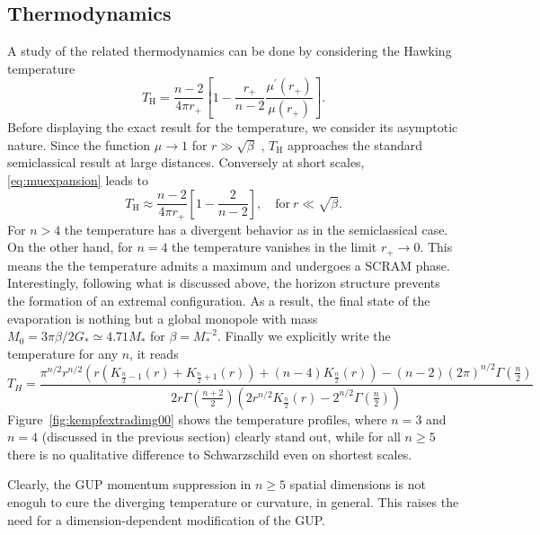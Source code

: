 \subsection{Thermodynamics}
A study of the related thermodynamics can be done by considering
the Hawking temperature 
\begin{equation}\label{eq:temp-higher-dim-def}
T_\mathrm{H}=\frac{n-2}{4\pi r_+}\left[1-\frac{r_+}{n-2}\frac{\mu^\prime(r_+)}{\mu(r_+)}\right].
\end{equation}
Before displaying the exact result for the temperature, we consider its asymptotic nature. Since the function $\mu\to 1$ for $r\gg \sqrt{\beta}$ , $T_\mathrm{H}$ approaches the standard semiclassical result at large distances. Conversely at short scales, \eqref{eq:muexpansion} leads to 
\begin{equation}
T_\mathrm{H}\approx\frac{n-2}{4\pi r_+}\left[1-\frac{2}{n-2}\right], \quad \mathrm{for}\ r\ll \sqrt{\beta}.
\end{equation}
For $n>4$ the temperature has a divergent behavior as in the semiclassical case. On the other hand, for $n=4$ the temperature vanishes in the limit $r_+\to 0$. This means the the temperature admits a maximum and undergoes a SCRAM phase. Interestingly, following what is discussed above, the horizon structure prevents the formation of an extremal configuration. As a result,  the final state of the evaporation is nothing but a global monopole with mass $M_0=3\pi\beta/2G_\ast\simeq 4.71 M_\ast$ for $\beta=M_\ast^{-2}$. 
%
Finally we explicitly write the temperature for any $n$, it reads
\cite{bachelor-knipfer14}
\begin{equation}
T_H = \frac{\pi ^{n/2} r^{n/2} \left(r
	\left(K_{\frac{n}{2}-1}(r)+K_{\frac{n}{2}+1}(r)\right)+
	(n-4) K_{\frac{n}{2}}(r)\right)-(n-2) (2 \pi )^{n/2}
	\Gamma \left(\frac{n}{2}\right)}{2 r \Gamma
	\left(\frac{n+2}{2}\right) \left(2 r^{n/2}
	K_{\frac{n}{2}}(r)-2^{n/2} \Gamma
	\left(\frac{n}{2}\right)\right)}
\end{equation}
Figure~\ref{fig:kempfextradimg00} shows the temperature profiles, where $n=3$
and $n=4$ (discussed in the previous section) clearly stand out, while for all
$n \geq 5$ there is no qualitative difference to Schwarzschild even on shortest
scales.

Clearly, the GUP momentum suppression in $n\geq 5$ spatial dimensions
is not enoguh to cure the diverging temperature or curvature, in general.
This raises the need for a dimension-dependent modification of the GUP.


